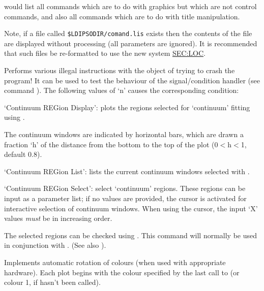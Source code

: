 \begin {description}
would list all commands which are to do with graphics but which are not
control commands, and also all commands which are to do with title
manipulation.

Note, if a file called {\tt{\$LDIPSODIR/comand\-.lis}}  exists then the
contents of the file are displayed without processing (all parameters are
ignored). It is recommended that such files be re-formatted to use the
new system \hyperref{as described earlier}{(see section}{)}{SEC:LOC}.

Performs various illegal instructions with the object of trying to
crash the program! It can be used to test the behaviour of the signal/condition
handler (see command ).  The following values of `n' causes the
corresponding condition:

\begin{dipdesc}
\end{dipdesc}

`Continuum REGion Display': plots the regions selected for `continuum'
fitting using . 

The continuum windows are indicated by horizontal bars, which are
drawn a fraction `h' of the distance from the bottom to the top of the
plot (0$<$h$<$1, default 0.8).

`Continuum REGion List': lists the current continuum windows selected
with . 

`Continuum REGion Select': select `continuum' regions. These regions
can be input as a parameter list; if no values are provided, the
cursor is activated for interactive selection of continuum windows.
When using the cursor, the input `X' values {\em must} be in
increasing order.

The selected regions can be checked using .  This command will
normally be used in conjunction with .  (See also ). 

Implements automatic rotation of colours (when used with appropriate
hardware). Each plot begins with the colour specified by the last call
to   (or colour 1, if   hasn't been called).


\end{description}
